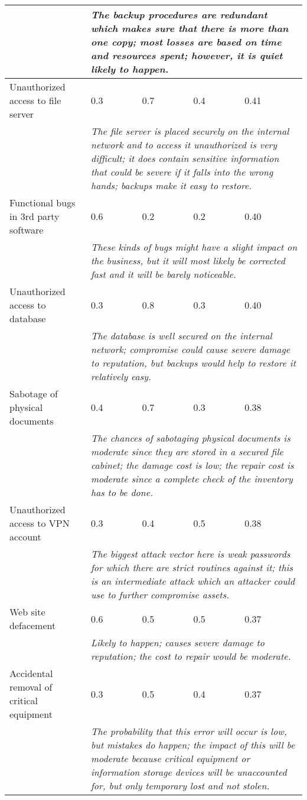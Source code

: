 \begin{longtable}{| p{4.2cm} | p{1.8cm} | p{1.8cm} | p{1.8cm} | p{1.8cm} |}
		& \multicolumn{4}{|p{8cm}|}{\textit{The backup procedures are redundant which makes sure that there is more than one copy; most losses are based on time and resources spent; however, it is quiet likely to happen.}}\\\hline
		Unauthorized access to file server & 0.3 & 0.7 & 0.4 & 0.41\\\hline
		& \multicolumn{4}{|p{8cm}|}{\textit{The file server is placed securely on the internal network and to access it unauthorized is very difficult; it does contain sensitive information that could be severe if it falls into the wrong hands; backups make it easy to restore.}}\\\hline
		Functional bugs in 3rd party software & 0.6 & 0.2 & 0.2 & 0.40\\\hline
		& \multicolumn{4}{|p{8cm}|}{\textit{These kinds of bugs might have a slight impact on the business, but it will most likely be corrected fast and it will be barely noticeable.}}\\\hline
		Unauthorized access to database & 0.3 & 0.8 & 0.3 & 0.40\\\hline
		& \multicolumn{4}{|p{8cm}|}{\textit{The database is well secured on the internal network;  compromise could cause severe damage to reputation, but backups would help to restore it relatively easy.}}\\\hline
		Sabotage of physical documents & 0.4 & 0.7 & 0.3 & 0.38\\\hline
		& \multicolumn{4}{|p{8cm}|}{\textit{The chances of sabotaging physical documents is moderate since they are stored in a secured file cabinet; the damage cost is low; the repair cost is moderate since a complete check of the inventory has to be done.}}\\\hline
		Unauthorized access to VPN account & 0.3 & 0.4 & 0.5 & 0.38\\\hline
		& \multicolumn{4}{|p{8cm}|}{\textit{The biggest attack vector here is weak passwords for which there are strict routines against it; this is an intermediate attack which an attacker could use to further compromise assets.}}\\\hline	
		Web site defacement & 0.6 & 0.5 & 0.5 & 0.37\\\hline
		& \multicolumn{4}{|p{8cm}|}{\textit{Likely to happen; causes severe damage to reputation; the cost to repair would be moderate.}}\\\hline
		Accidental removal of critical equipment & 0.3 & 0.5 & 0.4 & 0.37\\\hline
		& \multicolumn{4}{|p{8cm}|}{\textit{The probability that this error will occur is low, but mistakes do happen; the impact of this will be moderate because critical equipment or information storage devices will be unaccounted for, but only temporary lost and not stolen.}}\\\hline

\end{longtable}
